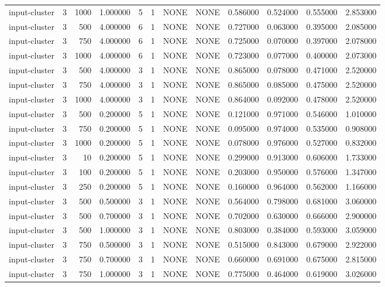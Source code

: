 \begin{tabular}{lrrrllllrrrr}
input-cluster & 3 & 1000 & 1.000000 & 5 & 1 & NONE & NONE & 0.586000 & 0.524000 & 0.555000 & 2.853000 \\
input-cluster & 3 & 500 & 4.000000 & 6 & 1 & NONE & NONE & 0.727000 & 0.063000 & 0.395000 & 2.085000 \\
input-cluster & 3 & 750 & 4.000000 & 6 & 1 & NONE & NONE & 0.725000 & 0.070000 & 0.397000 & 2.078000 \\
input-cluster & 3 & 1000 & 4.000000 & 6 & 1 & NONE & NONE & 0.723000 & 0.077000 & 0.400000 & 2.073000 \\
input-cluster & 3 & 500 & 4.000000 & 3 & 1 & NONE & NONE & 0.865000 & 0.078000 & 0.471000 & 2.520000 \\
input-cluster & 3 & 750 & 4.000000 & 3 & 1 & NONE & NONE & 0.865000 & 0.085000 & 0.475000 & 2.520000 \\
input-cluster & 3 & 1000 & 4.000000 & 3 & 1 & NONE & NONE & 0.864000 & 0.092000 & 0.478000 & 2.520000 \\
input-cluster & 3 & 500 & 0.200000 & 5 & 1 & NONE & NONE & 0.121000 & 0.971000 & 0.546000 & 1.010000 \\
input-cluster & 3 & 750 & 0.200000 & 5 & 1 & NONE & NONE & 0.095000 & 0.974000 & 0.535000 & 0.908000 \\
input-cluster & 3 & 1000 & 0.200000 & 5 & 1 & NONE & NONE & 0.078000 & 0.976000 & 0.527000 & 0.832000 \\
input-cluster & 3 & 10 & 0.200000 & 5 & 1 & NONE & NONE & 0.299000 & 0.913000 & 0.606000 & 1.733000 \\
input-cluster & 3 & 100 & 0.200000 & 5 & 1 & NONE & NONE & 0.203000 & 0.950000 & 0.576000 & 1.347000 \\
input-cluster & 3 & 250 & 0.200000 & 5 & 1 & NONE & NONE & 0.160000 & 0.964000 & 0.562000 & 1.166000 \\
input-cluster & 3 & 500 & 0.500000 & 3 & 1 & NONE & NONE & 0.564000 & 0.798000 & 0.681000 & 3.060000 \\
input-cluster & 3 & 500 & 0.700000 & 3 & 1 & NONE & NONE & 0.702000 & 0.630000 & 0.666000 & 2.900000 \\
input-cluster & 3 & 500 & 1.000000 & 3 & 1 & NONE & NONE & 0.803000 & 0.384000 & 0.593000 & 3.059000 \\
input-cluster & 3 & 750 & 0.500000 & 3 & 1 & NONE & NONE & 0.515000 & 0.843000 & 0.679000 & 2.922000 \\
input-cluster & 3 & 750 & 0.700000 & 3 & 1 & NONE & NONE & 0.660000 & 0.691000 & 0.675000 & 2.815000 \\
input-cluster & 3 & 750 & 1.000000 & 3 & 1 & NONE & NONE & 0.775000 & 0.464000 & 0.619000 & 3.026000 \\

\end{tabular}
